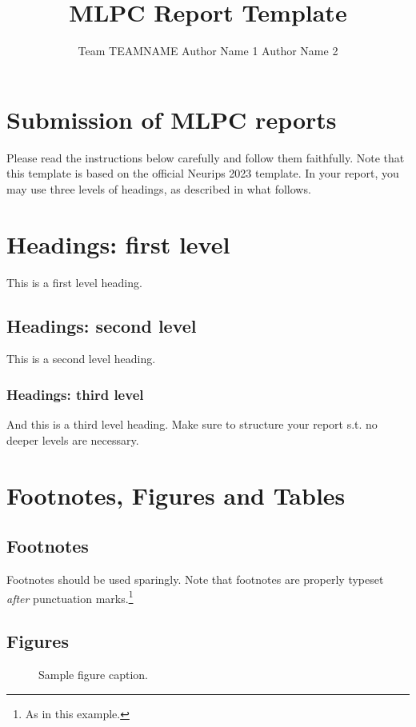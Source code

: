 \documentclass{article}
\title{MLPC Report Template}
\author{%
  Team TEAMNAME \AND
  Author Name 1
  \And
  Author Name 2 
}
\begin{document}
\maketitle


\section{Submission of MLPC reports}

Please read the instructions below carefully and follow them faithfully. Note that this template is based on the official Neurips 2023 template. In your report, you may use three levels of headings, as described in what follows. 

\section{Headings: first level}
\label{sec:headings}

This is a first level heading. 

\subsection{Headings: second level}

This is a second level heading. 


\subsubsection{Headings: third level}

And this is a third level heading. Make sure to structure your report s.t. no deeper levels are necessary. 

\section{Footnotes, Figures and Tables}

\subsection{Footnotes}
Footnotes should be used sparingly. Note that footnotes are properly typeset \emph{after} punctuation marks.\footnote{As in this example.}


\subsection{Figures}


\begin{figure}[h]
  \centering
  \fbox{\rule[-.5cm]{0cm}{4cm} \rule[-.5cm]{4cm}{0cm}}
  \caption{Sample figure caption.}
  \label{fig:example}
\end{figure}
\end{document}
